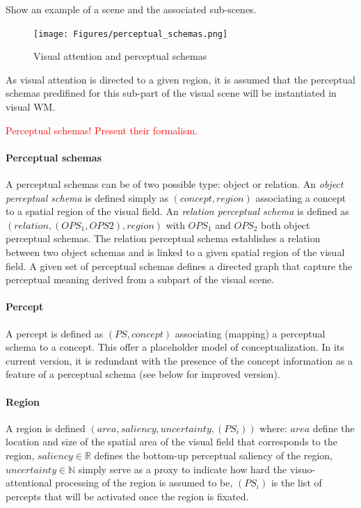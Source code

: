 \documentclass{article}
\newcommand\todo[1]{\textcolor{red}{#1}}
\begin{document}
Show an example of a scene and the associated sub-scenes.


\begin{figure}[H]
	\centering
	\texttt{[image: Figures/perceptual\_schemas.png]}
	\caption{Visual attention and perceptual schemas}
	\label{fig:perceptual_schemas}
\end{figure}

As visual attention is directed to a given region, it is assumed that the perceptual schemas predifined for this sub-part of the visual scene will be instantiated in visual WM.

\todo{Perceptual schemas! Present their formalism.}

\paragraph{Perceptual schemas}
A perceptual schemas can be of two possible type: object or relation. An \emph{object perceptual schema} is defined simply as $(concept, region)$ associating a concept to a spatial region of the visual field. An \emph{relation perceptual schema} is defined as $(relation, (OPS_1, OPS2), region)$ with $OPS_1$ and $OPS_2$ both object perceptual schemas. The relation perceptual schema establishes a relation between two object schemas and is linked to a given spatial region of the visual field.
A given set of perceptual schemas defines a directed graph that capture the perceptual meaning derived from a subpart of the visual scene. 

\paragraph{Percept}
A percept is defined as $(PS, concept)$ associating (mapping) a perceptual schema to a concept. This offer a placeholder model of conceptualization. In its current version, it is redundant with the presence of the concept information as a feature of a perceptual schema (see below for improved version).

\paragraph{Region}
A region is defined $(area, saliency, uncertainty, (PS_i))$ where: $area$ define the location and size of the spatial area of the visual field that corresponds to the region, $saliency \in \mathbb{R}$ defines the bottom-up perceptual saliency of the region, $uncertainty \in \mathbb{N}$ simply serve as a proxy to indicate how hard the visuo-attentional processing of the region is assumed to be, $(PS_i)$ is the list of percepts that will be activated once the region is fixated.
\end{document}
